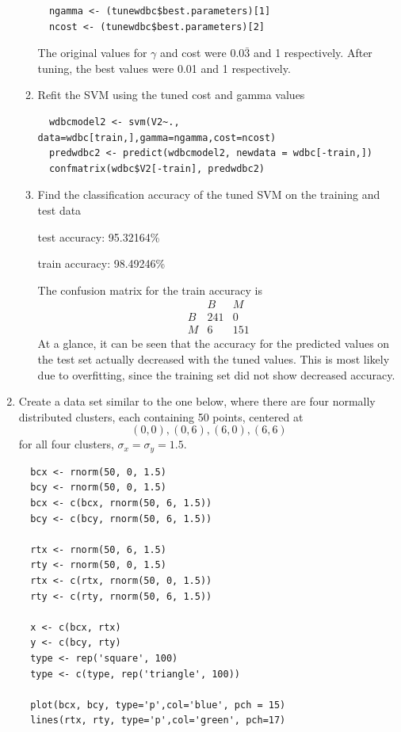 \documentclass[11pt]{article}
\begin{document}
\begin{enumerate}
\begin{enumerate}
\begin{Verbatim}
  ngamma <- (tunewdbc$best.parameters)[1]
  ncost <- (tunewdbc$best.parameters)[2]
  \end{Verbatim}

  The original values for $\gamma$ and cost were $0.0\bar{3}$ and 1 respectively. 
  After tuning, the best values were 0.01 and 1 respectively. 
  
  \item Refit the SVM using the tuned cost and gamma values
  \begin{Verbatim}
  wdbcmodel2 <- svm(V2~., data=wdbc[train,],gamma=ngamma,cost=ncost)
  predwdbc2 <- predict(wdbcmodel2, newdata = wdbc[-train,])
  confmatrix(wdbc$V2[-train], predwdbc2)
  \end{Verbatim}

  \item Find the classification accuracy of the tuned SVM on the training 
     and test data
  
   test accuracy: 95.32164\%

   train accuracy: 98.49246\%

   The confusion matrix for the train accuracy is 
   $$
   \begin{matrix}
       & B &   M  \\ 
       B & 241 &   0\\
       M &   6 & 151
   \end{matrix}
   $$
   At a glance, it can be seen that the accuracy for the predicted values on the 
   test set actually decreased with the tuned values. This is most likely due to 
   overfitting, since the training set did not show decreased accuracy. 
\end{enumerate}
\item
Create a data set similar to the one below, where there are four 
normally distributed clusters, each containing 50 points, centered at 
$$
                 (0, 0), (0, 6), (6, 0), (6, 6)
$$
for all four clusters, $\sigma_x = \sigma_y = 1.5$.
  \begin{Verbatim}
  bcx <- rnorm(50, 0, 1.5)
  bcy <- rnorm(50, 0, 1.5)
  bcx <- c(bcx, rnorm(50, 6, 1.5))
  bcy <- c(bcy, rnorm(50, 6, 1.5))
  
  rtx <- rnorm(50, 6, 1.5)
  rty <- rnorm(50, 0, 1.5)
  rtx <- c(rtx, rnorm(50, 0, 1.5))
  rty <- c(rty, rnorm(50, 6, 1.5))
  
  x <- c(bcx, rtx)
  y <- c(bcy, rty)
  type <- rep('square', 100)
  type <- c(type, rep('triangle', 100))
  
  plot(bcx, bcy, type='p',col='blue', pch = 15)
  lines(rtx, rty, type='p',col='green', pch=17)
  

\end{Verbatim}
\end{enumerate}
\end{document}
